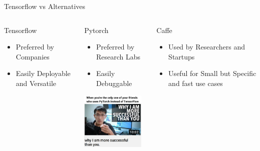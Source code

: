 \documentclass{beamer}
\begin{document}
\begin{frame}[fragile]{Tensorflow vs Alternatives}
\begin{columns}[T]
 \begin{column}{.33\textwidth}
     \begin{block}{Tensorflow}
     \begin{itemize}
     \item Preferred by Companies
     \item Easily Deployable and Versatile
    \end{itemize}
     \end{block}
   \end{column}
   
    \begin{column}{.33\textwidth}
     \begin{block}{Pytorch}
     \begin{itemize}
     \item Preferred by Research Labs
     \item Easily Debuggable
    \end{itemize}
    {\includegraphics[width=3cm]{images/altmeme.png}}
     \end{block}
   \end{column}
   
   \begin{column}{.33\textwidth}
     \begin{block}{Caffe}
     \begin{itemize}
     \item Used by Researchers and Startups
     \item Useful for Small but Specific and fast use cases
    \end{itemize}
     \end{block}
   \end{column}

\end{columns}
\end{frame}
\end{document}
